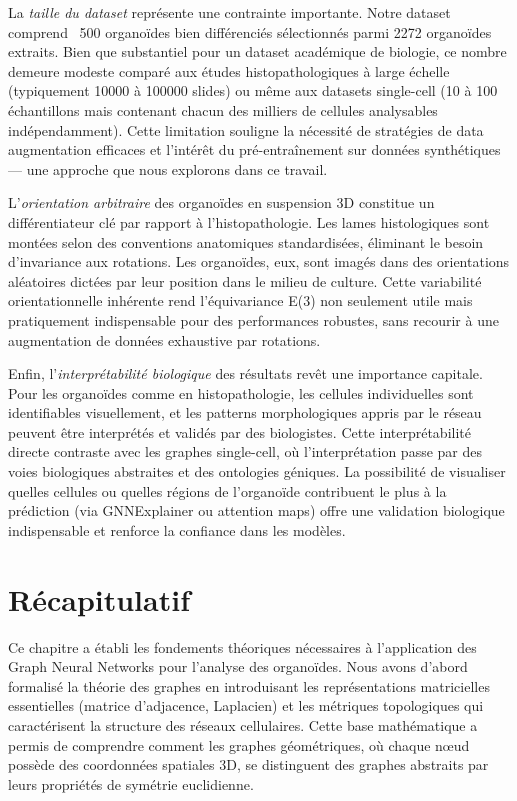 La \textit{taille du dataset} représente une contrainte importante. Notre dataset comprend ~500 organoïdes bien différenciés sélectionnés parmi 2272 organoïdes extraits. Bien que substantiel pour un dataset académique de biologie, ce nombre demeure modeste comparé aux études histopathologiques à large échelle (typiquement 10000 à 100000 slides) ou même aux datasets single-cell (10 à 100 échantillons mais contenant chacun des milliers de cellules analysables indépendamment). Cette limitation souligne la nécessité de stratégies de data augmentation efficaces et l'intérêt du pré-entraînement sur données synthétiques — une approche que nous explorons dans ce travail.

L'\textit{orientation arbitraire} des organoïdes en suspension 3D constitue un différentiateur clé par rapport à l'histopathologie. Les lames histologiques sont montées selon des conventions anatomiques standardisées, éliminant le besoin d'invariance aux rotations. Les organoïdes, eux, sont imagés dans des orientations aléatoires dictées par leur position dans le milieu de culture. Cette variabilité orientationnelle inhérente rend l'équivariance E(3) non seulement utile mais pratiquement indispensable pour des performances robustes, sans recourir à une augmentation de données exhaustive par rotations.

Enfin, l'\textit{interprétabilité biologique} des résultats revêt une importance capitale. Pour les organoïdes comme en histopathologie, les cellules individuelles sont identifiables visuellement, et les patterns morphologiques appris par le réseau peuvent être interprétés et validés par des biologistes. Cette interprétabilité directe contraste avec les graphes single-cell, où l'interprétation passe par des voies biologiques abstraites et des ontologies géniques. La possibilité de visualiser quelles cellules ou quelles régions de l'organoïde contribuent le plus à la prédiction (via GNNExplainer ou attention maps) offre une validation biologique indispensable et renforce la confiance dans les modèles.

\section*{Récapitulatif}

Ce chapitre a établi les fondements théoriques nécessaires à l'application des Graph Neural Networks pour l'analyse des organoïdes. Nous avons d'abord formalisé la théorie des graphes en introduisant les représentations matricielles essentielles (matrice d'adjacence, Laplacien) et les métriques topologiques qui caractérisent la structure des réseaux cellulaires. Cette base mathématique a permis de comprendre comment les graphes géométriques, où chaque nœud possède des coordonnées spatiales 3D, se distinguent des graphes abstraits par leurs propriétés de symétrie euclidienne.

